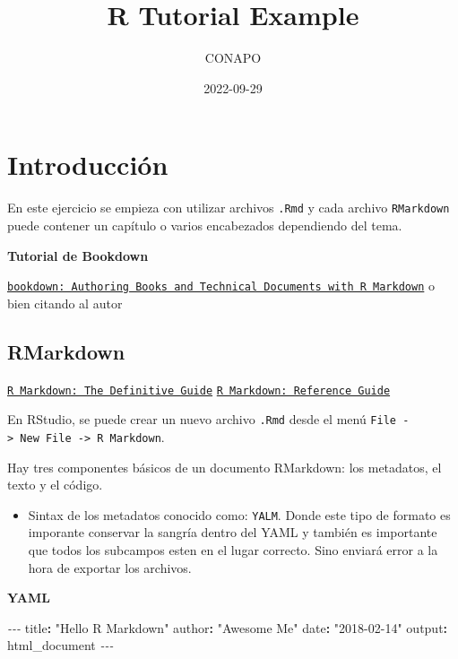 \documentclass[
]{book}
\title{R Tutorial Example}
\author{CONAPO}
\date{2022-09-29}
\newenvironment{Shaded}{\begin{snugshade}}{\end{snugshade}}
\newcommand{\AttributeTok}[1]{\textcolor[rgb]{0.77,0.63,0.00}{#1}}
\newcommand{\FunctionTok}[1]{\textcolor[rgb]{0.00,0.00,0.00}{#1}}
\newcommand{\KeywordTok}[1]{\textcolor[rgb]{0.13,0.29,0.53}{\textbf{#1}}}
\newcommand{\PreprocessorTok}[1]{\textcolor[rgb]{0.56,0.35,0.01}{\textit{#1}}}
\newcommand{\StringTok}[1]{\textcolor[rgb]{0.31,0.60,0.02}{#1}}
\providecommand{\tightlist}{%
  \setlength{\itemsep}{0pt}\setlength{\parskip}{0pt}}
\begin{document}
\maketitle

{
\setcounter{tocdepth}{1}
\tableofcontents
}
\hypertarget{introducciuxf3n}{%
\chapter{Introducción}\label{introducciuxf3n}}

En este ejercicio se empieza con utilizar archivos \texttt{.Rmd} y cada archivo \texttt{RMarkdown} puede contener un capítulo o varios encabezados dependiendo del tema.

\textbf{Tutorial de Bookdown}

\href{https://bookdown.org/yihui/bookdown/}{\texttt{bookdown:\ Authoring\ Books\ and\ Technical\ Documents\ with\ R\ Markdown}} o bien citando al autor \citet{bookdown2016}

\hypertarget{rmarkdown}{%
\section{RMarkdown}\label{rmarkdown}}

\href{https://bookdown.org/yihui/rmarkdown/}{\texttt{R\ Markdown:\ The\ Definitive\ Guide}}
\href{https://www.rstudio.com/wp-content/uploads/2015/03/rmarkdown-reference.pdf}{\texttt{R\ Markdown:\ Reference\ Guide}}

En RStudio, se puede crear un nuevo archivo \texttt{.Rmd} desde el menú \texttt{File\ -\textgreater{}\ New\ File\ -\textgreater{}\ R\ Markdown}.

Hay tres componentes básicos de un documento RMarkdown: los metadatos, el texto y el código.

\begin{itemize}
\tightlist
\item
  Sintax de los metadatos conocido como: \texttt{YALM}. Donde este tipo de formato es imporante conservar la sangría dentro del YAML y también es importante que todos los subcampos esten en el lugar correcto. Sino enviará error a la hora de exportar los archivos.
\end{itemize}

\textbf{YAML}

\begin{Shaded}
\begin{Highlighting}[]
\PreprocessorTok{{-}{-}{-}}
\FunctionTok{title}\KeywordTok{:}\AttributeTok{ }\StringTok{"Hello R Markdown"}
\FunctionTok{author}\KeywordTok{:}\AttributeTok{ }\StringTok{"Awesome Me"}
\FunctionTok{date}\KeywordTok{:}\AttributeTok{ }\StringTok{"2018{-}02{-}14"}
\FunctionTok{output}\KeywordTok{:}\AttributeTok{ html\_document}
\PreprocessorTok{{-}{-}{-}}
\end{Highlighting}
\end{Shaded}
\end{document}
